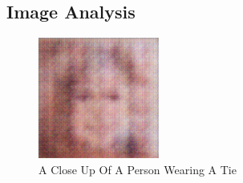 \documentclass{article}%
\begin{document}
%
\subsection{Image Analysis}%
\label{subsec:ImageAnalysis}%


\begin{figure}[h!]%
\centering%
\includegraphics[width=150px]{500_fake_images/samples_5_155.png}%
\caption{A Close Up Of A Person Wearing A Tie}%
\end{figure}

%
\end{document}
